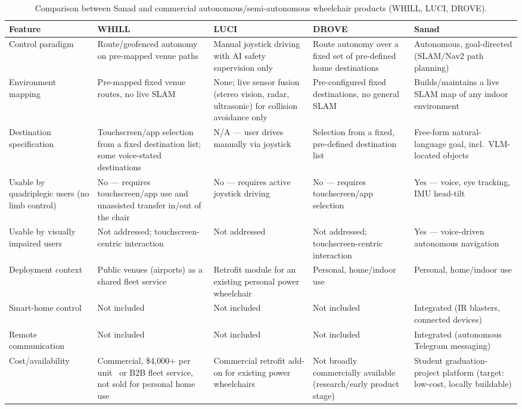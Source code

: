 \begin{table}[H]
\centering
\caption{Comparison between Sanad and commercial autonomous/semi-autonomous wheelchair products (WHILL, LUCI, DROVE).}
\begin{tabular}{|p{2.9cm}|p{2.9cm}|p{2.9cm}|p{2.9cm}|p{2.9cm}|}
\hline
\textbf{Feature} & \textbf{WHILL} & \textbf{LUCI} & \textbf{DROVE} & \textbf{Sanad} \\
\hline
Control paradigm & Route/geofenced autonomy on pre-mapped venue paths & Manual joystick driving with AI safety supervision only & Route autonomy over a fixed set of pre-defined home destinations & Autonomous, goal-directed (SLAM/Nav2 path planning) \\
\hline
Environment mapping & Pre-mapped fixed venue routes, no live SLAM & None; live sensor fusion (stereo vision, radar, ultrasonic) for collision avoidance only & Pre-configured fixed destinations, no general SLAM & Builds/maintains a live SLAM map of any indoor environment \\
\hline
Destination specification & Touchscreen/app selection from a fixed destination list; some voice-stated destinations & N/A --- user drives manually via joystick & Selection from a fixed, pre-defined destination list & Free-form natural-language goal, incl.\ VLM-located objects \\
\hline
Usable by quadriplegic users (no limb control) & No --- requires touchscreen/app use and unassisted transfer in/out of the chair & No --- requires active joystick driving & No --- requires touchscreen/app selection & Yes --- voice, eye tracking, IMU head-tilt \\
\hline
Usable by visually impaired users & Not addressed; touchscreen-centric interaction & Not addressed & Not addressed; touchscreen-centric interaction & Yes --- voice-driven autonomous navigation \\
\hline
Deployment context & Public venues (airports) as a shared fleet service & Retrofit module for an existing personal power wheelchair & Personal, home/indoor use & Personal, home/indoor use \\
\hline
Smart-home control & Not included & Not included & Not included & Integrated (IR blasters, connected devices) \\
\hline
Remote communication & Not included & Not included & Not included & Integrated (autonomous Telegram messaging) \\
\hline
Cost/availability & Commercial, \$4,000+ per unit~\cite{harvard2020whillcase} or B2B fleet service, not sold for personal home use & Commercial retrofit add-on for existing power wheelchairs & Not broadly commercially available (research/early product stage) & Student graduation-project platform (target: low-cost, locally buildable) \\
\hline
\end{tabular}
\label{table:commercial_comparison}
\end{table}

